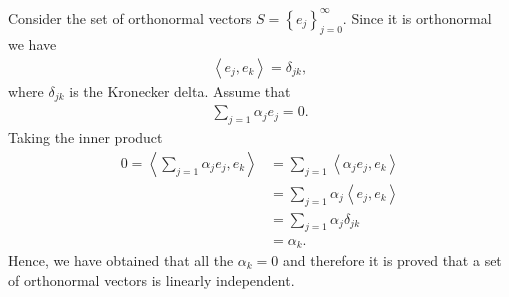 \begin{questions}

\begin{solution}
Consider the set of orthonormal vectors $S=\left\lbrace e_j\right\rbrace_{j=0}^{\infty}$. Since it is orthonormal we have
\begin{align*}
\left<e_j,e_k\right>=\delta_{jk},
\end{align*}
where $\delta_{jk}$ is the Kronecker delta. Assume that 
\begin{align*}
\sum_{j=1}\alpha_je_j=0.
\end{align*}
Taking the inner product
\begin{align*}
0=\left<\sum_{j=1}\alpha_je_j,e_k\right>&=\sum_{j=1}\left<\alpha_je_j,e_k\right>\\
&=\sum_{j=1}\alpha_j\left<e_j,e_k\right>\\
&=\sum_{j=1}\alpha_j\delta_{jk}\\
&=\alpha_k.
\end{align*}
Hence, we have obtained that all the $\alpha_k=0$ and therefore it is proved that a set of orthonormal vectors is linearly independent.
\end{solution}
\end{questions}
